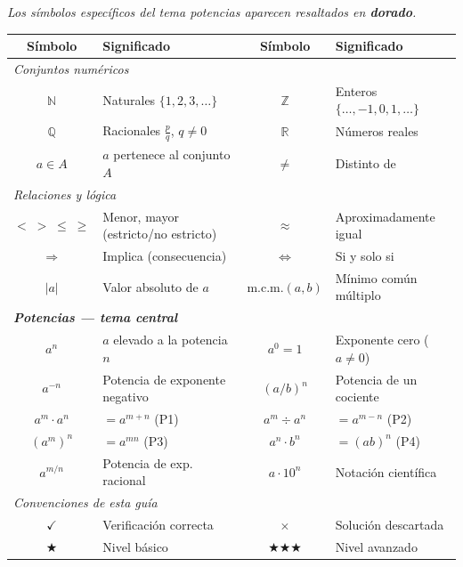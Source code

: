 \documentclass[11pt, letterpaper]{article}
\begin{document}
\begin{tcolorbox}[importantbox, title={Glosario de simbología}]
{\small\textit{Los símbolos específicos del tema potencias aparecen resaltados en \textcolor{zenitgold}{\textbf{dorado}}.}}
\medskip
\begin{center}
\renewcommand{\arraystretch}{1.32}
\begin{tabular}{c p{4.5cm} | c p{4.5cm}}
\toprule
\textbf{Símbolo} & \textbf{Significado} & \textbf{Símbolo} & \textbf{Significado}\\
\midrule
\multicolumn{4}{l}{\textit{Conjuntos numéricos}}\\
$\mathbb{N}$ & Naturales $\{1,2,3,\ldots\}$ & $\mathbb{Z}$ & Enteros $\{\ldots,-1,0,1,\ldots\}$\\
$\mathbb{Q}$ & Racionales $\frac{p}{q}$, $q\neq 0$ & $\mathbb{R}$ & Números reales\\
$a\in A$ & $a$ pertenece al conjunto $A$ & $\neq$ & Distinto de\\[3pt]
\multicolumn{4}{l}{\textit{Relaciones y lógica}}\\
$<\;>\;\leq\;\geq$ & Menor, mayor (estricto/no estricto) & $\approx$ & Aproximadamente igual\\
$\Rightarrow$ & Implica (consecuencia) & $\Leftrightarrow$ & Si y solo si\\
$|a|$ & Valor absoluto de $a$ & $\text{m.c.m.}(a,b)$ & Mínimo común múltiplo\\[3pt]
\multicolumn{4}{l}{\textit{\textcolor{zenitgold}{\textbf{Potencias — tema central}}}}\\
\textcolor{zenitgold}{$a^n$} & \textcolor{zenitgold}{$a$ elevado a la potencia $n$} & \textcolor{zenitgold}{$a^0=1$} & \textcolor{zenitgold}{Exponente cero ($a\neq 0$)}\\
\textcolor{zenitgold}{$a^{-n}$} & \textcolor{zenitgold}{Potencia de exponente negativo} & \textcolor{zenitgold}{$(a/b)^n$} & \textcolor{zenitgold}{Potencia de un cociente}\\
\textcolor{zenitgold}{$a^m\cdot a^n$} & \textcolor{zenitgold}{$=a^{m+n}$ (P1)} & \textcolor{zenitgold}{$a^m \div a^n$} & \textcolor{zenitgold}{$=a^{m-n}$ (P2)}\\
\textcolor{zenitgold}{$(a^m)^n$} & \textcolor{zenitgold}{$=a^{mn}$ (P3)} & \textcolor{zenitgold}{$a^n\cdot b^n$} & \textcolor{zenitgold}{$=(ab)^n$ (P4)}\\
\textcolor{zenitgold}{$a^{m/n}$} & \textcolor{zenitgold}{Potencia de exp. racional} & \textcolor{zenitgold}{$a\cdot 10^n$} & \textcolor{zenitgold}{Notación científica}\\[3pt]
\multicolumn{4}{l}{\textit{Convenciones de esta guía}}\\
$\checkmark$ & Verificación correcta & $\times$ & Solución descartada\\
$\bigstar$ & Nivel básico & $\bigstar\bigstar\bigstar$ & Nivel avanzado\\
\bottomrule
\end{tabular}
\end{center}
\end{tcolorbox}
\end{document}
